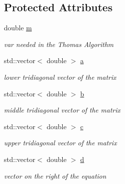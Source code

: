 \subsection*{Protected Attributes}
\begin{DoxyCompactItemize}
\item 
\mbox{\label{class_implicit_method_a40bd9e3fcd89952043c7c8a35011ba18}} 
double \hyperlink{class_implicit_method_a40bd9e3fcd89952043c7c8a35011ba18}{m}
\begin{DoxyCompactList}\small\item\em var needed in the Thomas Algorithm \end{DoxyCompactList}\item 
\mbox{\label{class_implicit_method_a8fb476719886d49583938c8b40e4875e}} 
std\+::vector$<$ double $>$ \hyperlink{class_implicit_method_a8fb476719886d49583938c8b40e4875e}{a}
\begin{DoxyCompactList}\small\item\em lower tridiagonal vector of the matrix \end{DoxyCompactList}\item 
\mbox{\label{class_implicit_method_a2e2487e270f55de28c1f4db5d1b6bc0d}} 
std\+::vector$<$ double $>$ \hyperlink{class_implicit_method_a2e2487e270f55de28c1f4db5d1b6bc0d}{b}
\begin{DoxyCompactList}\small\item\em middle tridiagonal vector of the matrix \end{DoxyCompactList}\item 
\mbox{\label{class_implicit_method_aa66f38115300db94c12b7f95ad6c17f9}} 
std\+::vector$<$ double $>$ \hyperlink{class_implicit_method_aa66f38115300db94c12b7f95ad6c17f9}{c}
\begin{DoxyCompactList}\small\item\em upper tridiagonal vector of the matrix \end{DoxyCompactList}\item 
\mbox{\label{class_implicit_method_a6e7d54136b7f6c21226b7de14b2308cb}} 
std\+::vector$<$ double $>$ \hyperlink{class_implicit_method_a6e7d54136b7f6c21226b7de14b2308cb}{d}
\begin{DoxyCompactList}\small\item\em vector on the right of the equation \end{DoxyCompactList}\end{DoxyCompactItemize}


